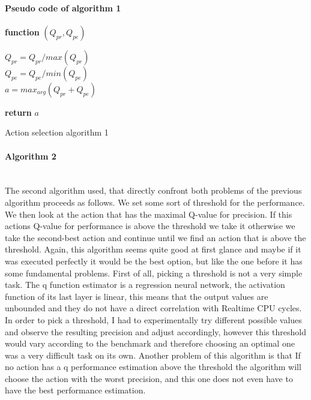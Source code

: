 \paragraph{Pseudo code of algorithm 1}
\begin{center}
\begin{algorithm}

    \textbf{function}  $(Q_{pr},Q_{pe})$\;
    
    
    \Indp{}\Indm
    \Indp{} \Indm
    \Indp
    $Q_{pr} = Q_{pr}/max(Q_{pr})$\\
    $Q_{pe} = Q_{pe}/min(Q_{pe})$\\
    $a = max_{arg}(Q_{pr}+Q_{pe})$
    
  
   \textbf{return} $a$

\caption{Action selection algorithm 1}
\end{algorithm}
\end{center}
\paragraph{Algorithm 2}\mbox{}\\
The second algorithm used, that directly confront both problems of the previous algorithm proceeds as follows. We set some sort of threshold for the performance. We then look at the action that has the maximal Q-value for precision. If this actions Q-value for performance is above the threshold we take it otherwise we take the second-best action and continue until we find an action that is above the threshold. Again, this algorithm seems quite good at first glance and maybe if it was executed perfectly it would be the best option, but like the one before it has some fundamental problems. First of all, picking a threshold is not a very simple task. The q function estimator is a regression neural network, the activation function of its last layer is linear, this means that the output values are unbounded and they do not have a direct correlation with Realtime CPU cycles. In order to pick a threshold, I had to experimentally try different possible values and observe the resulting precision and adjust accordingly, however this threshold would vary according to the benchmark and therefore choosing an optimal one was a very difficult task on its own. Another problem of this algorithm is that If no action has a q performance estimation above the threshold the algorithm will choose the action with the worst precision, and this one does not even have to have the best performance estimation. 
